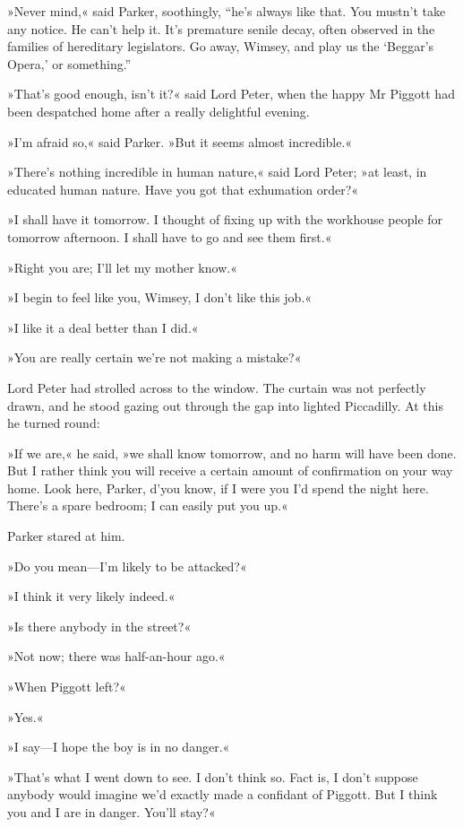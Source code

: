 »Never mind,« said Parker, soothingly, “he's always like that. You mustn't take any notice. He can't help it. It's premature senile decay, often observed in the families of hereditary legislators. Go away, Wimsey, and play us the ‘Beggar's Opera,' or something.”

»That's good enough, isn't it?« said Lord Peter, when the happy Mr Piggott had been despatched home after a really delightful evening.

»I'm afraid so,« said Parker. »But it seems almost incredible.«

»There's nothing incredible in human nature,« said Lord Peter; »at least, in educated human nature. Have you got that exhumation order?«

»I shall have it tomorrow. I thought of fixing up with the workhouse people for tomorrow afternoon. I shall have to go and see them first.«

»Right you are; I'll let my mother know.«

»I begin to feel like you, Wimsey, I don't like this job.«

»I like it a deal better than I did.«

»You are really certain we're not making a mistake?«

Lord Peter had strolled across to the window. The curtain was not perfectly drawn, and he stood gazing out through the gap into lighted Piccadilly. At this he turned round:

»If we are,« he said, »we shall know tomorrow, and no harm will have been done. But I rather think you will receive a certain amount of confirmation on your way home. Look here, Parker, d'you know, if I were you I'd spend the night here. There's a spare bedroom; I can easily put you up.«

Parker stared at him.

»Do you mean\allowbreak---\allowbreak I'm likely to be attacked?«

»I think it very likely indeed.«

»Is there anybody in the street?«

»Not now; there was half-an-hour ago.«

»When Piggott left?«

»Yes.«

»I say\allowbreak---\allowbreak I hope the boy is in no danger.«

»That's what I went down to see. I don't think so. Fact is, I don't suppose anybody would imagine we'd exactly made a confidant of Piggott. But I think you and I are in danger. You'll stay?«

